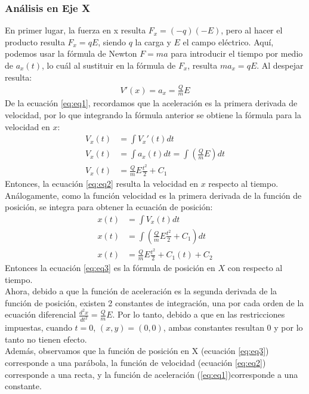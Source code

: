 \documentclass[12pt, letterpaper]{report}
\begin{document}
\subsubsection*{Análisis en Eje X}
En primer lugar, la fuerza en x resulta $F_x = (-q)(-E)$, pero al hacer el producto resulta $F_x = qE$, siendo $q$ la carga y $E$ el campo eléctrico. Aquí, podemos usar la fórmula de Newton $F = ma$ para 
introducir el tiempo por medio de $a_x(t)$, lo cuál al sustituir en la fórmula de $F_x$, resulta $ma_x = qE$. Al despejar resulta: 
\begin{align}
V'(x) = a_x = \frac{Q}{m}E
\label{eq:eq1}
\end{align} 
De la ecuación \ref{eq:eq1}, recordamos que la aceleración es la primera derivada de velocidad, por lo que integrando la fórmula anterior se obtiene la fórmula para 
la velocidad en $x$: 
\begin{align}
V_x(t) &= \int V_x'(t)dt \\
V_x(t) &= \int a_x(t)dt = \int (\frac{Q}{m}E)dt\\
V_x(t) &= \frac{Q}{m}E\frac{t^2}{2} + C_1
\label{eq:eq2}
\end{align}
Entonces, la ecuación \ref{eq:eq2} resulta la velocidad en $x$ respecto al tiempo. Análogamente, como la función velocidad es la primera derivada de la función de posición, 
se integra para obtener la ecuación de posición: 
\begin{align}
x(t) &= \int V_x(t)dt \\
x(t) &= \int (\frac{Q}{m}E\frac{t^2}{2} + C_1)dt \\
x(t) &= \frac{Q}{m}E\frac{t^2}{2} + C_1(t) + C_2
\label{eq:eq3}
\end{align}
Entonces la ecuación \ref{eq:eq3} es la fórmula de posición en $X$ con respecto al tiempo. \\

Ahora, debido a que la función de aceleración es la segunda derivada de la función de posición, existen 2 constantes de 
integración, una por cada orden de la ecuación diferencial $\frac{d^2x}{dt^2} = \frac{Q}{m}E$. Por lo tanto, debido a que en las restricciones impuestas, 
cuando $t = 0$, $(x, y) = (0,0)$, ambas constantes resultan 0 y por lo tanto no tienen efecto. \\

Además, observamos que la función de posición en X (ecuación \ref{eq:eq3}) corresponde a una parábola, la función de velocidad (ecuación \ref{eq:eq2}) corresponde a una recta, 
y la función de aceleración (\ref{eq:eq1})corresponde a una constante. 
\end{document}
